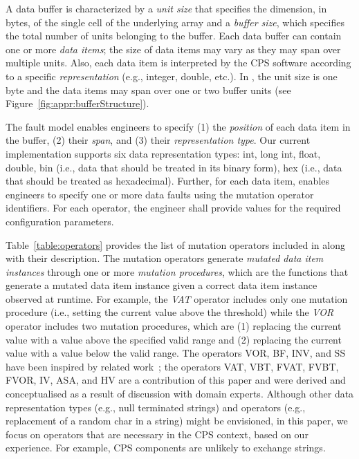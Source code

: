 A data buffer is characterized by a \emph{unit size} that specifies the dimension, in bytes, of the single cell of the underlying array and a \emph{buffer size}, which specifies the total number of units belonging to the buffer. Each data buffer can contain one or more \emph{data items}; the size of data items may vary as they may span over multiple units. Also, each data item is interpreted by the CPS software according to a specific \emph{representation} (e.g., integer, double, etc.). 
In \ESAIL, the unit size is one byte and the data items may span over one or two buffer units (see Figure~\ref{fig:appr:bufferStructure}). 

The \APPR fault model enables engineers to specify (1) the \emph{position} of each data item in the buffer, (2) their \emph{span}, and (3) their \emph{representation type}. Our current implementation supports six data representation types: int, long int, float, double, bin (i.e., data that should be treated in its binary form), hex (i.e., data that should be treated as hexadecimal).
Further, for each data item, \APPR enables engineers to specify one or more data faults using the mutation operator identifiers. For each operator, the engineer 
shall provide values for the required configuration parameters.

Table~\ref{table:operators} provides the list of mutation operators included in \APPR along with their description. The \APPR mutation operators generate \emph{mutated data item instances} through one or more \emph{mutation procedures}, which are the functions that generate a mutated data item instance given a correct data item instance observed at runtime. For example, the \emph{VAT} operator includes only one mutation procedure (i.e., setting the current value above the threshold) while the \emph{VOR} operator includes two mutation procedures, which are
(1) replacing the current value with a value above the specified valid range and (2) replacing the current value with a value below the valid range.
The operators VOR, BF, INV, and SS have been inspired by related work~\cite{di2015generating,PeachFuzzer,Matinnejad19}; the operators VAT, VBT, FVAT, FVBT, FVOR, IV, ASA,  and HV
are a contribution of this paper and were derived and conceptualised as a result of discussion with domain experts.
Although other data representation types (e.g., null terminated strings) and operators (e.g., replacement of a random char in a string) might be envisioned, in this paper, we focus on operators that are necessary in the CPS context, based on our experience.
For example, CPS components are unlikely to exchange strings.

